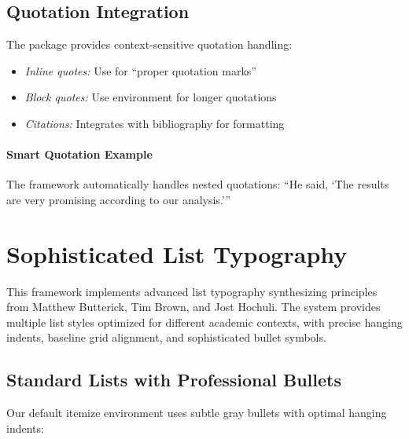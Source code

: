\documentclass[11pt]{article}
\begin{document}
\subsection{Quotation Integration}

The  package provides context-sensitive quotation handling:

\begin{itemize}
\item \emph{Inline quotes:} Use  for \enquote{proper quotation marks}
\item \emph{Block quotes:} Use  environment for longer quotations
\item \emph{Citations:} Integrates with bibliography for  formatting
\end{itemize}

\paragraph{Smart Quotation Example} The framework automatically handles nested quotations: \enquote{He said, \enquote{The results are very promising according to our analysis.}}

\clearpage

\section{Sophisticated List Typography}

This framework implements advanced list typography synthesizing principles from Matthew Butterick, Tim Brown, and Jost Hochuli. The system provides multiple list styles optimized for different academic contexts, with precise hanging indents, baseline grid alignment, and sophisticated bullet symbols.

\subsection{Standard Lists with Professional Bullets}

Our default itemize environment uses subtle gray bullets with optimal hanging indents:
\end{document}
